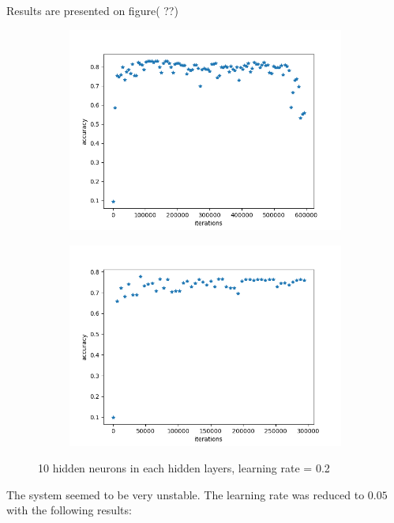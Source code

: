 Results are presented on figure( ??)


\begin{figure}[H]
\centering
\begin{subfigure}[b]{.45\linewidth}
\includegraphics[width=\linewidth]{img/tests/lwf/40ppl/h2/PCA_MLP15_10_102.png}
\end{subfigure}
\begin{subfigure}[b]{.45\linewidth}
\includegraphics[width=\linewidth]{img/tests/lwf/40ppl/h2/PCA_MLP15_10_103.png}
\end{subfigure}
\caption{10 hidden neurons in each hidden layers, learning rate = 0.2}
\end{figure}

The system seemed to be very unstable. The learning rate was reduced to $0.05$ with the following results:

